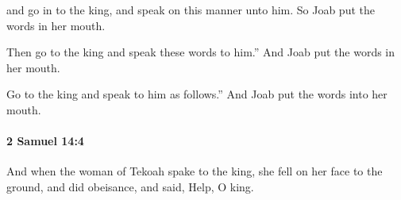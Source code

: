 			\begin{versebox}
					\item[BHS] 
					\item[ASV] and go in to the king, and speak on this manner unto him. So Joab put the words in her mouth.
					\item[NIV] Then go to the king and speak these words to him.” And Joab put the words in her mouth.
					\item[NRSV] Go to the king and speak to him as follows.” And Joab put the words into her mouth.
			\end{versebox}

		\paragraph{2 Samuel 14:4} %
			\label{2SAMUEL-14-4}

			And when the woman of Tekoah spake to the king, she fell on her face to the ground, and did obeisance, and said, Help, O king.

